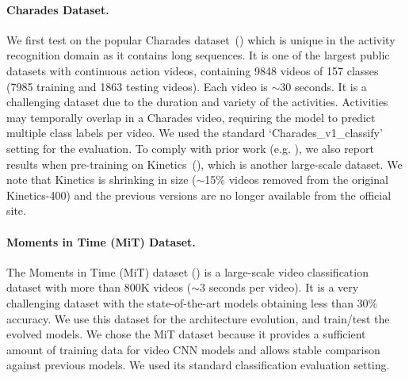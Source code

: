\documentclass{article} \usepackage{iclr2020_conference,times}
\begin{document}
\vspace{-5pt}
\paragraph{Charades Dataset.}
We first test on the popular Charades dataset~(\citealp{sigurdsson2016hollywood}) which is unique in the activity recognition domain as it contains long sequences. It is one of the largest public datasets with continuous action videos, containing 9848 videos of 157 classes (7985 training and 1863 testing videos). Each video is $\sim$30 seconds. It is a challenging dataset due to the duration and variety of the activities. Activities may temporally overlap in a Charades video, requiring the model to predict multiple class labels per video. We used the standard `Charades\_v1\_classify' setting for the evaluation. To comply with prior work (e.g. \citealp{feichtenhofer2018slowfast}), we also report results when pre-training on Kinetics~(\citealp{carreira2017quo}), which is another large-scale dataset. We note that Kinetics is shrinking in size ($\sim$15\% videos removed from the original Kinetics-400) and the previous versions are no longer available from the official site.


\vspace{-5pt}
\paragraph{Moments in Time (MiT) Dataset.}

The Moments in Time (MiT) dataset (\citealp{monfort2018moments}) is a large-scale video classification dataset with more than 800K videos ($\sim$3 seconds per video). It is a very challenging dataset with the state-of-the-art models obtaining less than 30\% accuracy. We use this dataset for the architecture evolution, and train/test the evolved models. We chose the MiT dataset because it provides a sufficient amount of training data for video CNN models and allows stable comparison against previous models. We used its standard classification evaluation setting.
\end{document}
